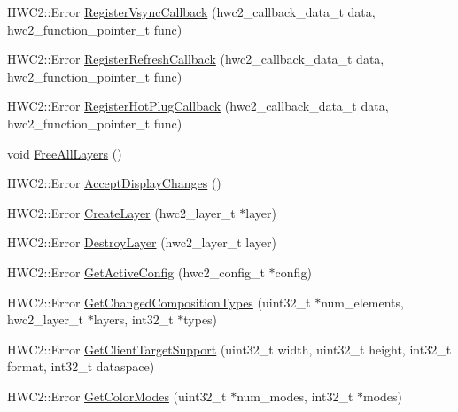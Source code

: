 \begin{DoxyCompactItemize}
H\+W\+C2\+::\+Error \mbox{\hyperlink{classandroid_1_1IAHWC2_1_1HwcDisplay_af8985b36e15ec94773805aca9f7df96e}{Register\+Vsync\+Callback}} (hwc2\+\_\+callback\+\_\+data\+\_\+t data, hwc2\+\_\+function\+\_\+pointer\+\_\+t func)
\item 
H\+W\+C2\+::\+Error \mbox{\hyperlink{classandroid_1_1IAHWC2_1_1HwcDisplay_ab165973e4324d38db10f9584e59eacfc}{Register\+Refresh\+Callback}} (hwc2\+\_\+callback\+\_\+data\+\_\+t data, hwc2\+\_\+function\+\_\+pointer\+\_\+t func)
\item 
H\+W\+C2\+::\+Error \mbox{\hyperlink{classandroid_1_1IAHWC2_1_1HwcDisplay_a433d61b77535463d4d2a0cefd4b45349}{Register\+Hot\+Plug\+Callback}} (hwc2\+\_\+callback\+\_\+data\+\_\+t data, hwc2\+\_\+function\+\_\+pointer\+\_\+t func)
\item 
void \mbox{\hyperlink{classandroid_1_1IAHWC2_1_1HwcDisplay_a26c6de4c4a210954ea627be435dab3d7}{Free\+All\+Layers}} ()
\item 
H\+W\+C2\+::\+Error \mbox{\hyperlink{classandroid_1_1IAHWC2_1_1HwcDisplay_a497e8468963a8f99091b0adf26e88d22}{Accept\+Display\+Changes}} ()
\item 
H\+W\+C2\+::\+Error \mbox{\hyperlink{classandroid_1_1IAHWC2_1_1HwcDisplay_ada75fdd0198f4af8c9d788e40ae3c2cf}{Create\+Layer}} (hwc2\+\_\+layer\+\_\+t $\ast$layer)
\item 
H\+W\+C2\+::\+Error \mbox{\hyperlink{classandroid_1_1IAHWC2_1_1HwcDisplay_a91b01f1cfa215f977198b586f9166a12}{Destroy\+Layer}} (hwc2\+\_\+layer\+\_\+t layer)
\item 
H\+W\+C2\+::\+Error \mbox{\hyperlink{classandroid_1_1IAHWC2_1_1HwcDisplay_af4afd09113abd2aeb5ad4f589f2e2925}{Get\+Active\+Config}} (hwc2\+\_\+config\+\_\+t $\ast$config)
\item 
H\+W\+C2\+::\+Error \mbox{\hyperlink{classandroid_1_1IAHWC2_1_1HwcDisplay_a189cf471b80eb0d791d18489410e4e9e}{Get\+Changed\+Composition\+Types}} (uint32\+\_\+t $\ast$num\+\_\+elements, hwc2\+\_\+layer\+\_\+t $\ast$layers, int32\+\_\+t $\ast$types)
\item 
H\+W\+C2\+::\+Error \mbox{\hyperlink{classandroid_1_1IAHWC2_1_1HwcDisplay_aed9220827da7c1223bdd057936dfdda9}{Get\+Client\+Target\+Support}} (uint32\+\_\+t width, uint32\+\_\+t height, int32\+\_\+t format, int32\+\_\+t dataspace)
\item 
H\+W\+C2\+::\+Error \mbox{\hyperlink{classandroid_1_1IAHWC2_1_1HwcDisplay_ae327c73dee0e2a29a0552ecbabb787c6}{Get\+Color\+Modes}} (uint32\+\_\+t $\ast$num\+\_\+modes, int32\+\_\+t $\ast$modes)
\item 

\end{DoxyCompactItemize}
